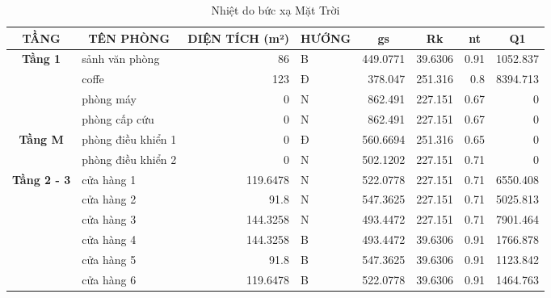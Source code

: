 \begin{table}[H]
	\centering
	\caption{Nhiệt do bức xạ Mặt Trời}
	\begin{adjustbox}{width=\textwidth}
	\begin{tabular}{|c|r|r|l|r|r|r|r|}
		\hline
		\textbf{TẦNG} & \multicolumn{1}{c|}{\textbf{TÊN PHÒNG}} & \multicolumn{1}{c|}{\textbf{DIỆN TÍCH (m²) }} & \multicolumn{1}{c|}{\textbf{HƯỚNG}} & \multicolumn{1}{c|}{\textbf{gs}} & \multicolumn{1}{c|}{\textbf{Rk}} & \multicolumn{1}{c|}{\textbf{nt}} & \multicolumn{1}{c|}{\textbf{Q1}} \bigstrut\\
		\hline
		\multirow{4}[8]{*}{\textbf{Tầng 1}} & \multicolumn{1}{l|}{sảnh văn phòng} & 86    & B     & 449.0771 & 39.6306 & 0.91  & 1052.837 \bigstrut\\
		\cline{2-8}          & \multicolumn{1}{l|}{coffe} & 123   & Đ     & 378.047 & 251.316 & 0.8   & 8394.713 \bigstrut\\
		\cline{2-8}          & \multicolumn{1}{l|}{phòng máy} & 0     & N     & 862.491 & 227.151 & 0.67  & 0 \bigstrut\\
		\cline{2-8}          & \multicolumn{1}{l|}{phòng cấp cứu} & 0     & N     & 862.491 & 227.151 & 0.67  & 0 \bigstrut\\
		\hline
		\multirow{2}[4]{*}{\textbf{Tầng M}} & \multicolumn{1}{l|}{phòng điều khiển 1} & 0     & Đ     & 560.6694 & 251.316 & 0.65  & 0 \bigstrut\\
		\cline{2-8}          & \multicolumn{1}{l|}{phòng điều khiển 2} & 0     & N     & 502.1202 & 227.151 & 0.71  & 0 \bigstrut\\
		\hline
		\multirow{6}[12]{*}{\textbf{Tầng 2 - 3}} & \multicolumn{1}{l|}{cửa hàng 1} & 119.6478 & N     & 522.0778 & 227.151 & 0.71  & 6550.408 \bigstrut\\
		\cline{2-8}          & \multicolumn{1}{l|}{cửa hàng 2} & 91.8  & N     & 547.3625 & 227.151 & 0.71  & 5025.813 \bigstrut\\
		\cline{2-8}          & \multicolumn{1}{l|}{cửa hàng 3} & 144.3258 & N     & 493.4472 & 227.151 & 0.71  & 7901.464 \bigstrut\\
		\cline{2-8}          & \multicolumn{1}{l|}{cửa hàng 4} & 144.3258 & B     & 493.4472 & 39.6306 & 0.91  & 1766.878 \bigstrut\\
		\cline{2-8}          & \multicolumn{1}{l|}{cửa hàng 5} & 91.8  & B     & 547.3625 & 39.6306 & 0.91  & 1123.842 \bigstrut\\
		\cline{2-8}          & \multicolumn{1}{l|}{cửa hàng 6} & 119.6478 & B     & 522.0778 & 39.6306 & 0.91  & 1464.763 \bigstrut\\

\end{tabular}
\end{adjustbox}
\end{table}
